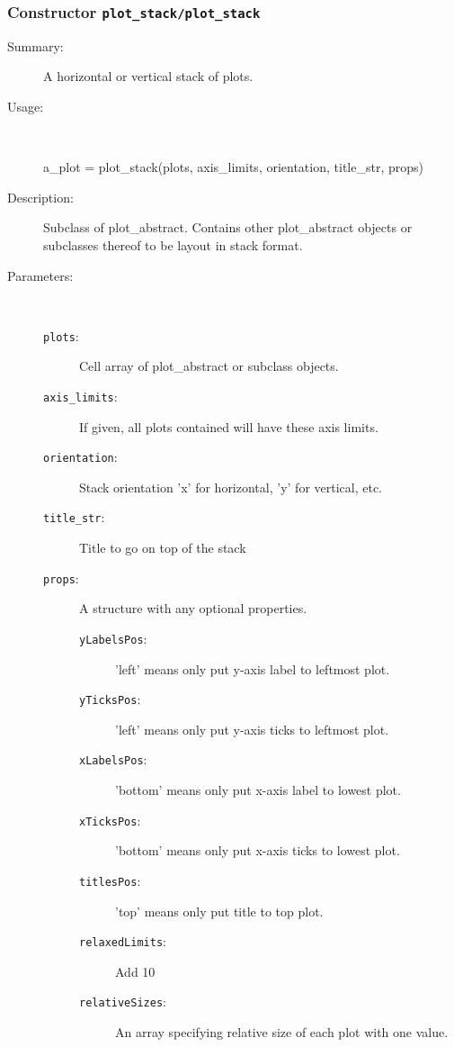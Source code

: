 \subsubsection[Constructor \texttt{plot\_stack}]{Constructor \texttt{plot\_stack/plot\_stack}}%
%
\label{ref_plot_stack__plot_stack}%
\hypertarget{ref_plot_stack__plot_stack}{}%
\begin{description}
\item[Summary:]A horizontal or vertical stack of plots.
%
\item[Usage:]~%
\begin{lyxcode}%
a\_plot = plot\_stack(plots, axis\_limits, orientation, title\_str, props)
%
\end{lyxcode}%
%
\item[Description:]%
Subclass of plot\_abstract. Contains other plot\_abstract objects or
 subclasses thereof to be layout in stack format. 
\item[Parameters:]~
\begin{description}%
\item[\texttt{plots}:]
 Cell array of plot\_abstract or subclass objects.
\item[\texttt{axis\_limits}:]
 If given, all plots contained will have these axis limits.
\item[\texttt{orientation}:]
 Stack orientation 'x' for horizontal, 'y' for vertical, etc.
\item[\texttt{title\_str}:]
 Title to go on top of the stack
\item[\texttt{props}:]
 A structure with any optional properties.
\begin{description}%
\item[\texttt{yLabelsPos}:]
 'left' means only put y-axis label to leftmost plot.
\item[\texttt{yTicksPos}:]
 'left' means only put y-axis ticks to leftmost plot.
\item[\texttt{xLabelsPos}:]
 'bottom' means only put x-axis label to lowest plot.
\item[\texttt{xTicksPos}:]
 'bottom' means only put x-axis ticks to lowest plot.
\item[\texttt{titlesPos}:]
 'top' means only put title to top plot.
\item[\texttt{relaxedLimits}:]
 Add 10%
\item[\texttt{relativeSizes}:]
 An array specifying relative size of each plot with one value.


\end{description}
\end{description}
\end{description}
